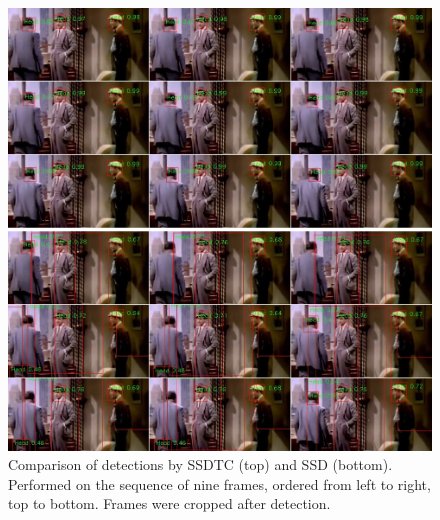 \begin{figure}
    \centering
    \includegraphics[width=\textwidth]{img/ssdt_ssdtc_comp}
    \caption[Comparison of detections by SSDTC and SSD]{Comparison of detections by SSDTC (top) and SSD (bottom). Performed on the sequence of nine frames, ordered from left to right, top to bottom. Frames were cropped after detection.}
    \label{fig:ssdssdtccomp}
\end{figure}